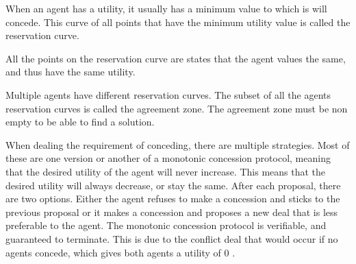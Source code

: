 \begin{definition*}
	\label{def:rev:agree}
	When an agent has a utility, it usually has a minimum value to which is will concede. This curve of all points that have the minimum utility value is called the reservation curve. 
	
	All the points on the reservation curve are states that the agent values the same, and thus have the same utility. 
	
	{\centering
		\par}
	
	Multiple agents have different reservation curves. The subset of all the agents reservation curves is called the agreement zone. The agreement zone must be non empty to be able to find a solution. 
		
\end{definition*}

When dealing the requirement of conceding, there are multiple strategies. Most of these are one version or another of a monotonic concession protocol, meaning that the desired utility of the agent will never increase. This means that the desired utility will always decrease, or stay the same. After each proposal, there are two options. Either the agent refuses to make a concession and sticks to the previous proposal or it makes a concession and proposes a new deal that is less preferable to the agent. The monotonic concession protocol is verifiable, and guaranteed to terminate. This is due to the conflict deal that would occur if no agents concede, which gives both agents a utility of 0 \citep{endriss2006monotonic}.


